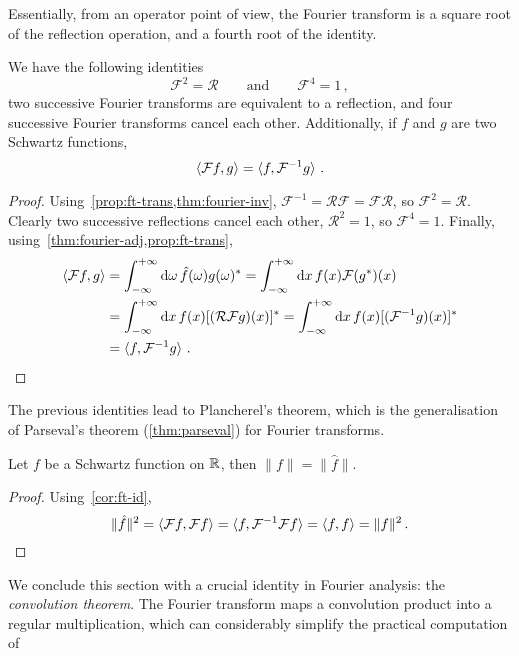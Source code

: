 Essentially, from an operator point of view, the Fourier transform is a square root of the
reflection operation, and a fourth root of the identity.
\begin{corollary}
  \label{cor:ft-id}
  We have the following identities
  \begin{equation}
    \mathcal{F}^2=\mathcal{R}\qquad\text{and}\qquad\mathcal{F}^4=1\,,
  \end{equation}
  \ie two successive Fourier transforms are equivalent to a reflection, and four
  successive Fourier transforms cancel each other. Additionally, if $f$ and $g$ are two
  Schwartz functions,
  \begin{equation}
    \braket{\mathcal{F}f,g}=\braket{f,\mathcal{F}^{-1}g}\,.
  \end{equation}
\end{corollary}
\begin{proof}
  Using~\cref{prop:ft-trans,thm:fourier-inv},
  $\mathcal{F}^{-1}=\mathcal{R}\mathcal{F}=\mathcal{F}\mathcal{R}$, so
  $\mathcal{F}^2=\mathcal{R}$. Clearly two successive reflections cancel each other, \ie
  $\mathcal{R}^2=1$, so $\mathcal{F}^4=1$. Finally,
  using~\cref{thm:fourier-adj,prop:ft-trans},
  \begin{align}
    \braket{\mathcal{F}f,g}&=\int_{-\infty}^{+\infty}\mathrm{d}{\omega}\,\hat{f}(\omega)g(\omega)^*
    =\int_{-\infty}^{+\infty}\mathrm{d}{x}\,f(x)\mathcal{F}(g^*)(x)\\
    &=\int_{-\infty}^{+\infty}\mathrm{d}{x}\,f(x)[(\mathcal{R}\mathcal{F}g)(x)]^*
    =\int_{-\infty}^{+\infty}\mathrm{d}{x}\,f(x)[(\mathcal{F}^{-1}g)(x)]^*\\
    &=\braket{f,\mathcal{F}^{-1}g}\,.
  \end{align}
\end{proof}
The previous identities lead to Plancherel's theorem, which is the generalisation of
Parseval's theorem (\cref{thm:parseval}) for Fourier transforms.
\begin{theorem}[Plancherel]
  Let $f$ be a Schwartz function on $\mathbb{R}$, then $\|f\|=\|\hat{f}\|$.
\end{theorem}
\begin{proof}
  Using~\cref{cor:ft-id},
  \begin{equation}
    \|\hat{f}\|^2=\braket{\mathcal{F}f,\mathcal{F}f}
    =\braket{f,\mathcal{F}^{-1}\mathcal{F}f}
    =\braket{f,f}=\|f\|^2\,.
  \end{equation}
\end{proof}
We conclude this section with a crucial identity in Fourier analysis: the
\emph{convolution theorem}. The Fourier transform maps a convolution product into a
regular multiplication, which can considerably simplify the practical computation of
